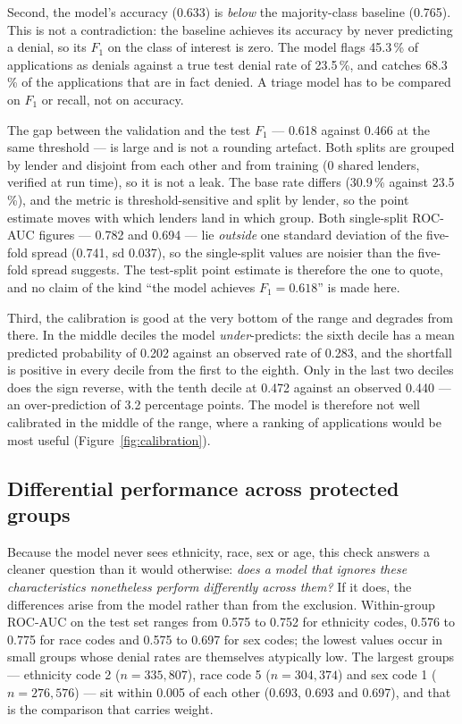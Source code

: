 \documentclass[sigconf,balance=false]{acmart}
\begin{document}
Second, the model's accuracy (0.633) is \emph{below} the majority-class
baseline (0.765). This is not a contradiction: the baseline achieves its
accuracy by never predicting a denial, so its $F_1$ on the class of interest
is zero. The model flags 45.3\,\% of applications as denials against a true
test denial rate of 23.5\,\%, and catches 68.3\,\% of the applications that
are in fact denied. A triage model has to be compared on $F_1$ or recall,
not on accuracy.

The gap between the validation and the test $F_1$ --- 0.618 against 0.466 at
the same threshold --- is large and is not a rounding artefact. Both splits
are grouped by lender and disjoint from each other and from training (0
shared lenders, verified at run time), so it is not a leak. The base rate
differs (30.9\,\% against 23.5\,\%), and the metric is threshold-sensitive
and split by lender, so the point estimate moves with which lenders land in
which group. Both single-split ROC-AUC figures --- 0.782 and 0.694 --- lie
\emph{outside} one standard deviation of the five-fold spread (0.741, sd
0.037), so the single-split values are noisier than the five-fold spread
suggests. The test-split point estimate is therefore the one to quote, and
no claim of the kind ``the model achieves $F_1 = 0.618$'' is made here.

Third, the calibration is good at the very bottom of the range and degrades
from there. In the middle deciles the model \emph{under}-predicts: the sixth
decile has a mean predicted probability of 0.202 against an observed rate of
0.283, and the shortfall is positive in every decile from the first to the
eighth. Only in the last two deciles does the sign reverse, with the tenth
decile at 0.472 against an observed 0.440 --- an over-prediction of 3.2
percentage points. The model is therefore not well calibrated in the middle
of the range, where a ranking of applications would be most useful
(Figure~\ref{fig:calibration}).

\subsection{Differential performance across protected groups}
\label{sec:fairness}

Because the model never sees ethnicity, race, sex or age, this check
answers a cleaner question than it would otherwise: \emph{does a model that ignores
these characteristics nonetheless perform differently across them?} If it
does, the differences arise from the model rather than from the exclusion.
Within-group ROC-AUC on the test set ranges from 0.575 to 0.752 for
ethnicity codes, 0.576 to 0.775 for race codes and 0.575 to 0.697 for sex
codes; the lowest values occur in small groups whose denial rates are
themselves atypically low. The largest groups --- ethnicity code 2
($n = 335{,}807$), race code 5 ($n = 304{,}374$) and sex code 1
($n = 276{,}576$) --- sit within 0.005 of each other (0.693, 0.693 and
0.697), and that is the comparison that carries weight.
\end{document}
